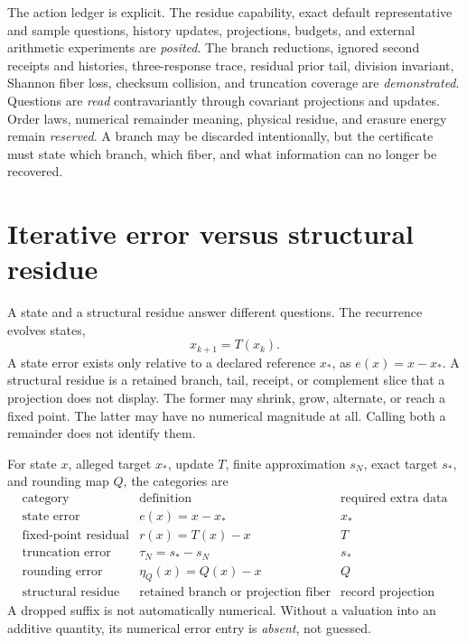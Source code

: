 The action ledger is explicit.  The residue capability, exact default representative and sample questions, history
updates, projections, budgets, and external arithmetic experiments are \emph{posited}.  The branch reductions,
ignored second receipts and histories, three-response trace, residual prior tail, division invariant, Shannon fiber
loss, checksum collision, and truncation coverage are \emph{demonstrated}.  Questions are \emph{read}
contravariantly through covariant projections and updates.  Order laws, numerical remainder meaning, physical residue,
and erasure energy remain \emph{reserved}.  A branch may be discarded intentionally, but the certificate must state
which branch, which fiber, and what information can no longer be recovered.

\section{Iterative error versus structural residue}

A state and a structural residue answer different questions.  The recurrence evolves states,
\[
                         x_{k+1}=T(x_k).
\]
A state error exists only relative to a declared reference \(x_*\), as \(e(x)=x-x_*\).
A structural residue is a retained branch, tail, receipt, or complement slice that a projection does not display.
The former may shrink, grow, alternate, or reach a fixed point.  The latter may have no numerical magnitude at all.
Calling both a remainder does not identify them.

For state \(x\), alleged target \(x_*\), update \(T\), finite approximation \(s_N\), exact target \(s_*\), and rounding
map \(Q\), the categories are
\[
\begin{array}{c|c|c}
\text{category}&\text{definition}&\text{required extra data}\\
\hline
\text{state error}&e(x)=x-x_*&x_*\\
\text{fixed-point residual}&r(x)=T(x)-x&T\\
\text{truncation error}&\tau_N=s_*-s_N&s_*\\
\text{rounding error}&\eta_Q(x)=Q(x)-x&Q\\
\text{structural residue}&\text{retained branch or projection fiber}&\text{record projection}
\end{array}
\]
A dropped suffix is not automatically numerical.  Without a valuation into an additive quantity, its numerical error
entry is \emph{absent}, not guessed.

